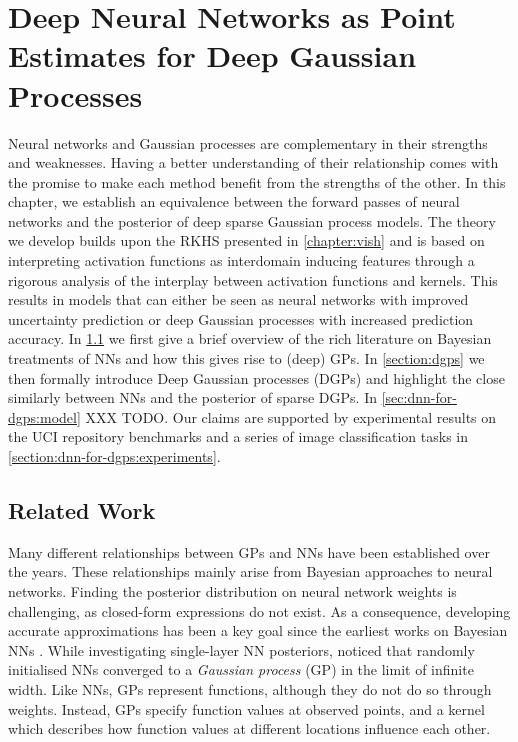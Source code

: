 \ifpdf
    \graphicspath{{Chapter4/Figs/Vector/}{Chapter4/Figs/PDF/}{Chapter4/Figs/}}
\else
    \graphicspath{{Chapter4/Figs/Raster/}{Chapter4/Figs/}}
\fi



\chapter{Deep Neural Networks as Point Estimates for Deep Gaussian Processes}
\label{chapter:dnn-as-point-estimate-for-dgps}

Neural networks and Gaussian processes are complementary in their strengths and weaknesses. Having a better understanding of their relationship comes with the promise to make each method benefit from the strengths of the other. In this chapter, we establish an equivalence between the forward passes of neural networks and the posterior of deep sparse Gaussian process models. The theory we develop builds upon the RKHS presented in \cref{chapter:vish} and is based on interpreting activation functions as interdomain inducing features through a rigorous analysis of the interplay between activation functions and kernels. This results in models that can either be seen as neural networks with improved uncertainty prediction or deep Gaussian processes with increased prediction accuracy. In \cref{section:dnn-for-dgps:related-work} we first give a brief overview of the rich literature on Bayesian treatments of NNs and how this gives rise to (deep) GPs. In \cref{section:dgps} we then formally introduce Deep Gaussian processes (DGPs) and highlight the close similarly between NNs and the posterior of sparse DGPs. In \cref{sec:dnn-for-dgps:model} XXX TODO.  Our claims are supported by experimental results on the UCI repository benchmarks and a series of image classification tasks in \cref{section:dnn-for-dgps:experiments}.

\section{Related Work}
\label{section:dnn-for-dgps:related-work}
Many different relationships between GPs and NNs have been established over the years. These relationships mainly arise from Bayesian approaches to neural networks. %
Finding the posterior distribution on neural network weights is challenging, as closed-form expressions do not exist. As a consequence, developing accurate approximations has been a key goal since the earliest works on Bayesian NNs \citep{mackay1992practical}.
While investigating single-layer NN posteriors, \citet{neal1996bayesian} noticed that randomly initialised NNs converged to a \emph{Gaussian process} (GP) in the limit of infinite width.
Like NNs, GPs represent functions, although they do not do so through weights. Instead, GPs specify function values at observed points, and a kernel which describes how function values at different locations influence each other.

